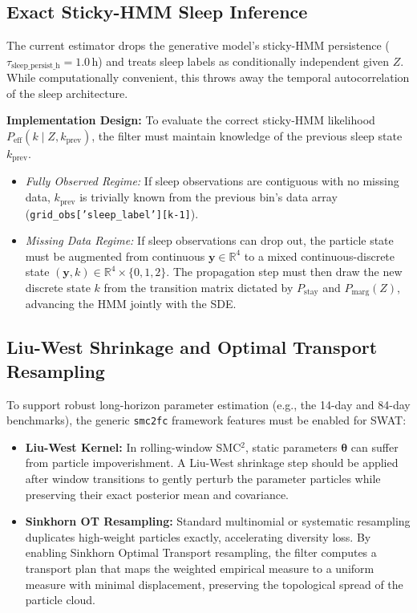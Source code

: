 \documentclass[11pt,a4paper]{article}
\begin{document}
\subsection{Exact Sticky-HMM Sleep Inference}
The current estimator drops the generative model's sticky-HMM persistence ($\tau_{\text{sleep\_persist\_h}} = 1.0$\,h) and treats sleep labels as conditionally independent given $Z$. While computationally convenient, this throws away the temporal autocorrelation of the sleep architecture.

\textbf{Implementation Design:}
To evaluate the correct sticky-HMM likelihood $P_{\text{eff}}(k \mid Z, k_{\text{prev}})$, the filter must maintain knowledge of the previous sleep state $k_{\text{prev}}$.
\begin{itemize}
    \item \textit{Fully Observed Regime:} If sleep observations are contiguous with no missing data, $k_{\text{prev}}$ is trivially known from the previous bin's data array (\texttt{grid\_obs['sleep\_label'][k-1]}).
    \item \textit{Missing Data Regime:} If sleep observations can drop out, the particle state must be augmented from continuous $\mathbf{y} \in \mathbb{R}^4$ to a mixed continuous-discrete state $(\mathbf{y}, k) \in \mathbb{R}^4 \times \{0,1,2\}$. The propagation step must then draw the new discrete state $k$ from the transition matrix dictated by $P_{\text{stay}}$ and $P_{\text{marg}}(Z)$, advancing the HMM jointly with the SDE.
\end{itemize}

\subsection{Liu-West Shrinkage and Optimal Transport Resampling}
To support robust long-horizon parameter estimation (e.g., the 14-day and 84-day benchmarks), the generic \texttt{smc2fc} framework features must be enabled for SWAT:
\begin{itemize}
    \item \textbf{Liu-West Kernel:} In rolling-window SMC$^2$, static parameters $\boldsymbol{\theta}$ can suffer from particle impoverishment. A Liu-West shrinkage step should be applied after window transitions to gently perturb the parameter particles while preserving their exact posterior mean and covariance.
    \item \textbf{Sinkhorn OT Resampling:} Standard multinomial or systematic resampling duplicates high-weight particles exactly, accelerating diversity loss. By enabling Sinkhorn Optimal Transport resampling, the filter computes a transport plan that maps the weighted empirical measure to a uniform measure with minimal displacement, preserving the topological spread of the particle cloud.
\end{itemize}
\end{document}

